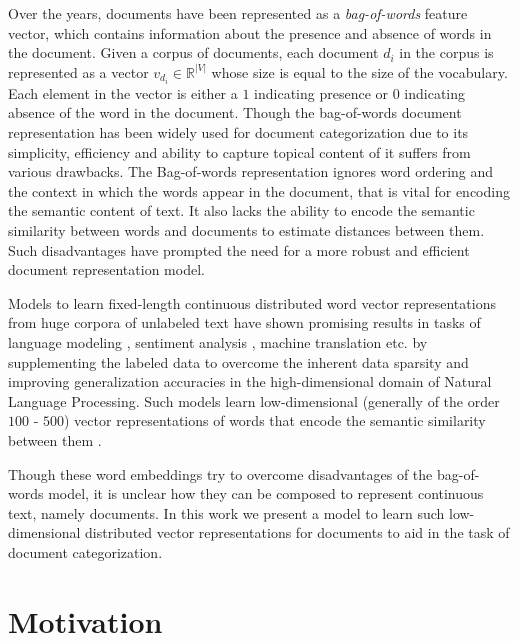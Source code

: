 Over the years, documents have been represented as a \emph{bag-of-words} 
feature vector, which contains information about the presence and 
absence of words in the document. Given a corpus of documents, each 
document $d_{i}$ in the corpus is represented as a vector 
$v_{d_{i}} \in \mathbb{R}^{|V|}$ whose size is equal to the size of 
the vocabulary. Each element in the vector is either a $1$ indicating
presence or $0$ indicating absence of the word in the document. 
Though the bag-of-words document representation has been widely used for 
document categorization due to its simplicity, efficiency and ability 
to capture topical content of it suffers from various drawbacks. The 
Bag-of-words representation ignores word ordering and the context in 
which the words appear in the document, that is vital for encoding the 
semantic content of text. It also lacks the ability to encode the 
semantic similarity between words and documents to estimate distances between them. Such disadvantages have prompted the need for a 
more robust and efficient document representation model.

Models to learn fixed-length continuous distributed word vector 
representations from huge corpora of unlabeled text have shown 
promising results in tasks of language modeling \cite{bengio2003neural},
sentiment analysis \cite{socher2013recursive}, machine translation
\cite{zou2013bilingual} etc. by supplementing the labeled data to 
overcome the inherent data sparsity and improving generalization 
accuracies in the high-dimensional domain of Natural Language 
Processing. Such models learn low-dimensional (generally of the order 
$100$ - $500$) vector representations of words that encode the 
semantic similarity between them \citep{mikolov2013efficient}. 

Though these word embeddings try to overcome disadvantages of the bag-of-words model, it is unclear how they can be composed to represent continuous text, namely documents. In this work we present a model to learn such low-dimensional distributed vector representations for documents to aid in the task of document categorization.
 
\section{Motivation}

